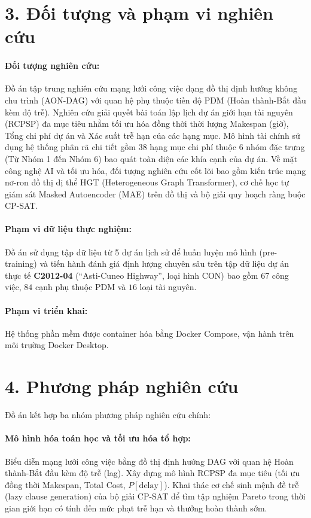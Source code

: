 \section*{3. Đối tượng và phạm vi nghiên cứu}

\paragraph{Đối tượng nghiên cứu:}
Đồ án tập trung nghiên cứu mạng lưới công việc dạng đồ thị định hướng không chu trình (AON-DAG) với quan hệ phụ thuộc tiến độ PDM (Hoàn thành-Bắt đầu kèm độ trễ). Nghiên cứu giải quyết bài toán lập lịch dự án giới hạn tài nguyên (RCPSP) đa mục tiêu nhằm tối ưu hóa đồng thời thời lượng Makespan (giờ), Tổng chi phí dự án và Xác suất trễ hạn của các hạng mục. Mô hình tài chính sử dụng hệ thống phân rã chi tiết gồm 38 hạng mục chi phí thuộc 6 nhóm đặc trưng (Từ Nhóm 1 đến Nhóm 6) bao quát toàn diện các khía cạnh của dự án. Về mặt công nghệ AI và tối ưu hóa, đối tượng nghiên cứu cốt lõi bao gồm kiến trúc mạng nơ-ron đồ thị dị thể HGT (Heterogeneous Graph Transformer), cơ chế học tự giám sát Masked Autoencoder (MAE) trên đồ thị và bộ giải quy hoạch ràng buộc CP-SAT.

\paragraph{Phạm vi dữ liệu thực nghiệm:} Đồ án sử dụng tập dữ liệu từ 5 dự án lịch sử để huấn luyện mô hình (pre-training) và tiến hành đánh giá định lượng chuyên sâu trên tập dữ liệu dự án thực tế \textbf{C2012-04} (``Asti-Cuneo Highway'', loại hình CON) bao gồm $67$ công việc, $84$ cạnh phụ thuộc PDM và $16$ loại tài nguyên.

\paragraph{Phạm vi triển khai:} Hệ thống phần mềm được container hóa bằng Docker Compose, vận hành trên môi trường Docker Desktop.

\section*{4. Phương pháp nghiên cứu}

Đồ án kết hợp ba nhóm phương pháp nghiên cứu chính:

\paragraph{Mô hình hóa toán học và tối ưu hóa tổ hợp:} Biểu diễn mạng lưới công việc bằng đồ thị định hướng DAG với quan hệ Hoàn thành-Bắt đầu kèm độ trễ (lag). Xây dựng mô hình RCPSP đa mục tiêu (tối ưu đồng thời Makespan, Total Cost, $P[\text{delay}]$). Khai thác cơ chế sinh mệnh đề trễ (lazy clause generation) của bộ giải CP-SAT để tìm tập nghiệm Pareto trong thời gian giới hạn có tính đến mức phạt trễ hạn và thưởng hoàn thành sớm.


